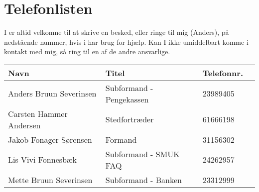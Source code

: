 \section{Telefonlisten}

I er altid velkomne til at skrive en besked, eller ringe til mig (Anders), på nedstående nummer, hvis 
i har brug for hjælp.
Kan I ikke umiddelbart komme i kontakt med mig, så ring til en af de andre ansvarlige.

\begin{table}[H]
    \centering
    \begin{tabular}{llll}
        Navn & Titel & Telefonnr. \\
        \hline
        \hline
        Anders Bruun Severinsen & Subformand - Pengekassen & 23989405 \\
        \hline
        Carsten Hammer Andersen & Stedfortræder & 61666198 \\
        \hline
        Jakob Fonager Sørensen & Formand & 31156302 \\
        \hline
        Lis Vivi Fonnesbæk & Subformand - SMUK FAQ & 24262957 \\
        \hline
        Mette Bruun Severinsen & Subformand - Banken & 23312999
    \end{tabular}
\end{table}